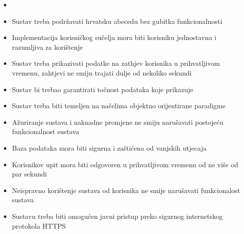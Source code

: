 \begin{itemize}
	\item {}
	\item {Sustav treba podržavati hrvatsku abecedu bez gubitka funkcionalnosti}
	\item {Implementacija korisničkog sučelja mora biti korisniku jednostavna i razumljiva za korištenje}
	\item {Sustav treba prikazivati podatke na zathjev korisnika u prihvatljivom vremenu, zahtjevi ne smiju trajati dulje od nekoliko sekundi}
	\item {Sustav bi trebao garantirati točnost podataka koje prikazuje}
	\item {Sustav treba biti temeljen na načelima objektno orijentirane paradigme}
	\item {Ažuriranje sustava i naknadne promjene ne smiju narušavati postojeću funkcionalnost sustava}
	\item {Baza podataka mora biti sigurna i zaštićena od vanjskih utjecaja}
	\item {Korisnikov upit mora biti odgovoren u prihvatljivom vremenu od ne više od par sekundi}
	\item {Neispravno korištenje sustava od korisnika ne smije narušavati funkcionalost sustava}
	\item {Sustavu treba biti omogućen javni pristup preko sigurnog internetskog protokola HTTPS}
\end{itemize}
			 
			 
			 
	
